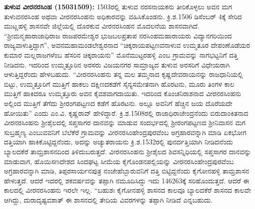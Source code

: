 \textbf{ತುಳುವ ವೀರನರಸಿಂಹ (1503\general{\enginline{-}}1509):} 1503ರಲ್ಲಿ ತುಳುವ ನರಸನಾಯಕನು ತೀರಿಕೊಳ್ಳಲು ಅವನ ಮಗ ತುಳುವನರಸಿಂಹ ಅಥವಾ ವೀರನರಸಿಂಹನು ಅಧಿಕಾರವನ್ನು ವಹಿಸಿಕೊಂಡನು. ಕ್ರಿ.ಶ.1506 ಡಿಸೆಂಬರ್​ 4ಕ್ಕೆ ಸೇರಿದ ಮುಟ್ಣಹಳ್ಳಿ ಶಾಸನವೇ ಜಿಲ್ಲೆಯಲ್ಲಿ ದೊರಕುವ ವೀರನರಸಿಂಹನ ಮೊದಲನೆಯ ಶಾಸನವಾಗಿದೆ. “ಶ‍್ರೀಮನ್ಮಹಾರಾಜಾಧಿರಾಜ ರಾಜಪರಮೇಶ್ವರ ಭುಜಬಲಪ್ರತಾಪ ನರಸಿಂಹಮಹಾರಾಯರು ವಿದ್ಯಾನಗರಿಯಿಂದ ರಾಜ್ಯವಾಳುತ್ತಿದ್ದಾಗ'', ಅವನ\break ಮಹಾಮಂಡಲೇಶ್ವರನಾದ “ಚಿಕ್ಕರಾಯಪಟ್ಟಣವನಾಳುವ ಉಮ್ಮತೂರ ದೇಪಂಣೊಡೆಯರ ಕುಮಾರ ಮಲ್ಲರಾಜಗಳೆಂಬ ಹೆಸರಿನ ಚಿಕ್ಕರಾಯನು'' ಮೊನೆಮುಟ್ಟರಹಳ್ಳಿ ಎಂಬ ಗ್ರಾಮವನ್ನು ನಾಗಭಟ್ಟನಿಗೆ ದತ್ತಿ ನೀಡಿದನು. ಇದರಿಂದ ಉಮ್ಮತ್ತೂರಿನ ಅರಸರು ವಿಜಯನಗರ ಸಾಮ್ರಾಜ್ಯದ ತುಳುವ ಅರಸರಿಗೆ ವಿಧೇಯರಾಗಿ ಆಳುತ್ತಿದ್ದರೆಂದು ಹೇಳಬಹುದು. “ವೀರನರಸಿಂಹನು ತನ್ನ ಮಲ ತಮ್ಮನಾದ ಕೃಷ್ಣದೇವರಾಯನನ್ನು ರಾಜಧಾನಿಯಲ್ಲಿ ಬಿಟ್ಟು, ಉಮ್ಮತ್ತೂರಿಗೆ ಮುತ್ತಿಗೆ ಹಾಕಲು ದಕ್ಷಿಣದಕಡೆಗೆ ಸೈನ್ಯಸಮೇತನಾಗಿ ಹೊರಟನು, ಮೂರು ತಿಂಗಳ ಕಾಲ ಮುತ್ತಿಗೆ ಹಾಕಿದರೂ ಉಮ್ಮತ್ತೂರು ಅವನ ಕೈವಶವಾಗದಾಯಿತು. ಇದರಿಂದ ಕೊಂಚನಿರಾಶನಾದ ವೀರನರಸಿಂಹನು ಅಲ್ಲಿಂದ ಮುತ್ತಿಗೆ ತೆಗೆದು ಶ‍್ರೀರಂಗಪಟ್ಟಣದ ಕಡೆಗೆ ಹೊರಟನು. ಅಲ್ಲೂ ಅವನಿಗೆ ಹೆಚ್ಚಿನ ಜಯ ದೊರೆಯದೇ ಹೋಯಿತು” ಎಂದು ಎಂ.ವಿ. ಕೃಷ್ಣರಾವ್​ ಹೇಳಿದ್ದಾರೆ. ಕ್ರಿ.ಶ.1508ರಲ್ಲಿ ರಾಜಾಧಿರಾಜೇಂದ್ರನೆಂದು ಬಿರುದಾಂಕಿತನಾದ ವೀರನರಸಿಂಹನು ಶ‍್ರೀಶೈಲದಲ್ಲಿ ಸಪ್ತಸಾಗರ ದಾನವನ್ನು ಮಾಡುವ ಸಂದರ್ಭದಲ್ಲಿ ಶ‍್ರೀರಂಗಪಟ್ಟಣದ ಶ‍್ರೀನಿವಾಸನ ಮಗ ಸುಬ್ರಹ್ಮಣ್ಯ ಎಂಬುವವನಿಗೆ ಬೆಲೆಕೆರೆ ಗ್ರಾಮವನ್ನು ವೀರನರಸಿಂಹೇಂದ್ರಪುರವೆಂಬ ಅಗ್ರಹಾರವನ್ನಾಗಿ ಮಾಡಿ ಏಕಭೋಗ ದತ್ತಿಯಾಗಿ ಹಾಕಿಕೊಟ್ಟಿದ್ದನೆಂದು, ಅದನ್ನು ಅಚ್ಯುತರಾಯನು ಕ್ರಿ.ಶ.1532ರಲ್ಲಿ ಪುನರ್ದತ್ತಿಯಾಗಿ ನೀಡಿದನೆಂದು ಬ್ಯಾಲದಕೆರೆ ತಾಮ್ರಶಾಸನದಿಂದ ತಿಳಿದುಬರುತ್ತದೆ. ವೀರನರಸಿಂಹನು ಶ‍್ರೀಶೈಲದ ಶಿವಸನ್ನಿಧಿಯಲ್ಲಿ ಸಪ್ತಸಾಗರ ದಾನವನ್ನು ಮಾಡುವಾಗ, ಹೊಯಿಸಣದೇಶದ ಸಿಂದಘಟ್ಟ ಸೀಮೆಯ ಕೈಗೊಂಡನಪಲ್ಲಿಯನ್ನು ವೀರನರಸಿಂಹೇಂದ್ರಪುರವೆಂಬ ಅಗ್ರಹಾರವನ್ನಾಗಿ ಮಾಡಿ, ತಿಪ್ಪರಸಾರ್ಯನಪುತ್ರ ನಂಜೇಹೆಬ್ಬಾರುವನಿಗೆ ದತ್ತಿ ಬಿಟ್ಟಿದ್ದನೆಂದು ಕೈಗೋನಹಳ್ಳಿ ತಾಮ್ರಶಾಸನ ಹೇಳುತ್ತದೆ. ಆದರೆ ಇದರಲ್ಲಿ ಶಕವರ್ಷವನ್ನು ತಪ್ಪಾಗಿ ನಮೂದಿಸಿದ್ದು ಇದು 1462\enginline{-}63ಕ್ಕೆ ಸರಿಹೊಂದುತ್ತದೆ. ಆದರೆ ಈ ಕಾಲದಲ್ಲಿ ವೀರನರಸಿಂಹನು ಇರಲೇ ಇಲ್ಲ. “ಬಹುಶಃ ಕೈಗೋನಹಳ್ಳಿ ಶಾಸನದ ಕಾಲವೂ ಬ್ಯಾಲದಕೆರೆ ಶಾಸನದ ಕಾಲವೇ ಆಗಿದ್ದು, ದುರಾದೃಷ್ಟವಶಾತ್​ ಈ ಶಾಸನದಲ್ಲಿ ತೇದಿಯ ವಿವರಗಳನ್ನು ತಪ್ಪಾಗಿ ನೀಡಿದೆ ಎನ್ನಬಹುದು.

